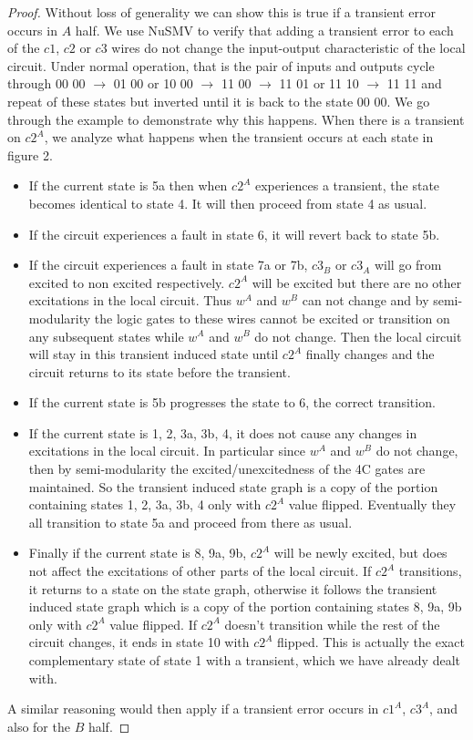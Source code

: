\documentclass{article}
\begin{document}
\begin{proof}
Without loss of generality we can show this is true if a transient error occurs in $A$ half.  We use NuSMV to verify that adding a transient error to each of the $c1$, $c2$ or $c3$ wires do not change the input-output characteristic of the local circuit.  Under normal operation, that is the pair of inputs and outputs cycle through 00 00 $\rightarrow$ 01 00 or 10 00 $\rightarrow$ 11 00 $\rightarrow$ 11 01 or 11 10 $\rightarrow$ 11 11 and repeat of these states but inverted until it is back to the state 00 00.   %
We go through the example to demonstrate why this happens.  When there is a transient on $c2^A$, we analyze what happens when the transient occurs at each state in figure 2.
\begin{itemize}
	\item
      If the current state is 5a then when $c2^A$ experiences a transient, the state
 becomes identical to state 4.  It will then proceed from state 4 as usual.   
	\item
If the circuit experiences a fault in state 6, it will revert back to state 5b.  
	\item
If the circuit experiences a fault in state 7a or 7b, $c3_B$ or $c3_A$ will go from excited to non excited respectively.  $c2^A$ will be excited but there are no other excitations in the local circuit.  Thus $w^A$ and $w^B$ can not change and by semi-modularity the logic gates to these wires cannot be excited or transition on any subsequent states while $w^A$ and $w^B$ do not change.  Then the local circuit will stay in this transient induced state until $c2^A$ finally changes and the circuit returns to its state before the transient.
	\item
If the current state is 5b progresses the state to 6, the correct transition.
	\item
If the current state is 1, 2, 3a, 3b, 4, it does not cause any changes in excitations in the local circuit.  In particular since $w^A$ and $w^B$ do not change, then by semi-modularity the excited/unexcitedness of the 4C gates are maintained.  So the transient induced state graph is a copy of the portion containing states 1, 2, 3a, 3b, 4 only with $c2^A$ value flipped. Eventually they all transition to state 5a and proceed from there as usual.
	\item
Finally if the current state is 8, 9a, 9b, $c2^A$ will be newly excited, but does not affect the excitations of other parts of the local circuit.  If $c2^A$ transitions, it returns to a state on the state graph, otherwise it follows the transient induced state graph which is a copy of the portion containing states 8, 9a, 9b only with $c2^A$ value flipped.  If $c2^A$ doesn't transition while the rest of the circuit changes, it ends in state 10 with $c2^A$ flipped.  This is actually the exact complementary state of state 1 with a transient, which we have already dealt with.
\end{itemize}
A similar reasoning would then apply if a transient error occurs in $c1^A$, $c3^A$, and also for the $B$ half.  
\end{proof}
\end{document}
